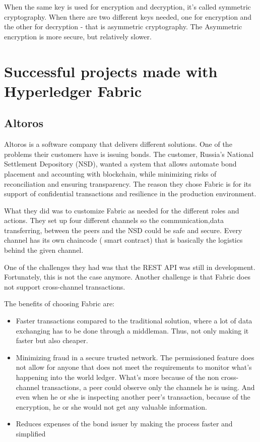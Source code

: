\documentclass[a4paper,11pt]{report}
\begin{document}
When the same key is used for encryption and decryption, it’s called symmetric cryptography. When there are two different keys needed, one for encryption and the other for decryption - that is asymmetric cryptography. The Asymmetric encryption is more secure, but relatively slower. \cite{symasym}


\section{Successful projects made with Hyperledger Fabric}
\label{successfulFabric}

\subsection{Altoros}
\label{altoros}
Altoros is a software company that delivers different solutions. One of the problems their customers have is issuing bonds. The customer, Russia's National Settlement Depository (NSD), wanted a system that allows automate bond placement and accounting with blockchain, while minimizing risks of reconciliation and ensuring transparency. The reason they chose Fabric is for its support of confidential transactions and resilience in the production environment. \cite{altoros}

	What they did was to customize Fabric as needed for the different roles and actions. They set up four different channels so the communication,data transferring, between the peers and the NSD could be safe and secure. Every channel has its own chaincode ( smart contract) that is basically the logistics behind the given channel.
	
	One of the challenges they had was that the REST API was still in development. Fortunately, this is not the case anymore. Another challenge is that Fabric does not support cross-channel transactions. \cite{altorosDemo}
	
The benefits of choosing Fabric are: 
\begin{itemize}
	
\item Faster transactions compared to the traditional solution, where a lot of data exchanging has to be done through a middleman. Thus, not only making it faster but also cheaper. 
\item Minimizing fraud in a secure trusted network. The permissioned feature does not allow for anyone that does not meet the requirements to monitor what’s happening into the world ledger. What’s more because of the non cross-channel transactions, a peer could observe only the channels he is using. And even when he or she is inspecting another peer’s transaction, because of the encryption, he or she would not get any valuable information. 
\item Reduces expenses of the bond issuer by making the process faster and simplified
	\end{itemize}
\end{document}
